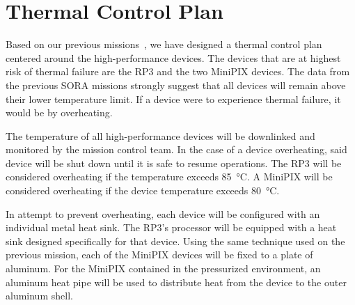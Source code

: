 \section{Thermal Control Plan}
\label{sec:TCP}


Based on our previous missions~\cite{SORA1}\cite{SORA2}, we have designed a thermal control plan centered around the high-performance devices. The devices that are at highest risk of thermal failure are the RP3 and the two MiniPIX devices. The data from the previous SORA missions strongly suggest that all devices will remain above their lower temperature limit. If a device were to experience thermal failure, it would be by overheating.

The temperature of all high-performance devices will be downlinked and monitored by the mission control team. In the case of a device overheating, said device will be shut down until it is safe to resume operations. The RP3 will be considered overheating if the temperature exceeds \SI{85}{\celsius}. A MiniPIX will be considered overheating if the device temperature exceeds \SI{80}{\celsius}.

In attempt to prevent overheating, each device will be configured with an individual metal heat sink. The RP3's processor will be equipped with a heat sink designed specifically for that device. Using the same technique used on the previous mission, each of the MiniPIX devices will be fixed to a plate of aluminum. For the MiniPIX contained in the pressurized environment, an aluminum heat pipe will be used to distribute heat from the device to the outer aluminum shell. 

